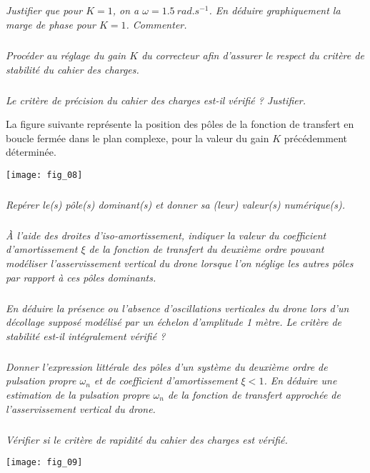 \begin{multicols}{2}
\subparagraph{}\textit{Justifier que pour $K=1$, on a $\omega=\SI{1,5}{rad.s^{-1}}$. En déduire graphiquement la marge de phase pour
$K=1$. Commenter.}

\subparagraph{}\textit{Procéder au réglage du gain $K$ du correcteur afin d’assurer le respect du critère de stabilité du cahier des charges.}
\ifprof
\begin{corrige}
\end{corrige}
\else
\fi

\subparagraph{}\textit{Le critère de précision du cahier des charges est-il vérifié ? Justifier.}
\ifprof
\begin{corrige}
\end{corrige}
\else
\fi

La figure suivante représente la position des pôles de la fonction de transfert en boucle fermée dans le plan
complexe, pour la valeur du gain $K$ précédemment déterminée.


\begin{center}
\texttt{[image: fig\_08]}
\end{center}


\subparagraph{}\textit{Repérer le(s) pôle(s) dominant(s) et donner sa (leur) valeur(s) numérique(s).}
\ifprof
\begin{corrige}
\end{corrige}
\else
\fi
\subparagraph{}\textit{À l’aide des droites d’iso-amortissement, indiquer la valeur du coefficient d’amortissement $\xi$ de la
fonction de transfert du deuxième ordre pouvant modéliser l’asservissement vertical du drone lorsque
l’on néglige les autres pôles par rapport à ces pôles dominants.}
\ifprof
\begin{corrige}
\end{corrige}
\else
\fi
\subparagraph{}\textit{En déduire la présence ou l’absence d’oscillations verticales du drone lors d’un décollage supposé
modélisé par un échelon d’amplitude 1 mètre. Le critère de stabilité est-il intégralement vérifié ?}
\ifprof
\begin{corrige}
\end{corrige}
\else
\fi
\subparagraph{}\textit{Donner l’expression littérale des pôles d’un système du deuxième ordre de pulsation propre $\omega_n$ et de coefficient d’amortissement $\xi<1$. En déduire une estimation de la pulsation propre $\omega_n$ de la
fonction de transfert approchée de l’asservissement vertical du drone.}
\ifprof
\begin{corrige}
\end{corrige}
\else
\fi
\subparagraph{}\textit{Vérifier si le critère de rapidité du cahier des charges est vérifié.}
\ifprof
\begin{corrige}
\end{corrige}
\else
\fi
\begin{center}
\texttt{[image: fig\_09]}
\end{center}




\end{multicols}
